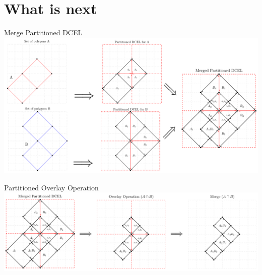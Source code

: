 \documentclass{beamer}
\begin{document}
\section{What is next}
\begin{frame}{Merge Partitioned DCEL}
    \centering 
    \includegraphics[width=\linewidth]{figures/OverlayParted} 
\end{frame}

\begin{frame}{Partitioned Overlay Operation}
    \centering 
    \includegraphics[width=\linewidth]{figures/OverlayParted2} 
\end{frame}
\end{document}
